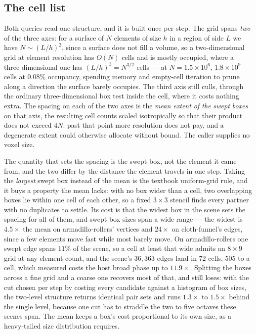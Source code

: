 \subsection{The cell list}
\label{sec:bp:grid}

Both queries read one structure, and it is built once per step. The grid spans
\emph{two} of the three axes: for a surface of $N$ elements of size $h$ in a
region of side $L$ we have $N \sim (L/h)^{2}$, since a surface does not fill a
volume, so a two-dimensional grid at element resolution has $O(N)$ cells and is
mostly occupied, where a three-dimensional one has $(L/h)^{3} = N^{3/2}$ cells
--- at $N = 1.5\times10^{6}$, $1.8\times10^{9}$ cells at $0.08\%$ occupancy,
spending memory and empty-cell iteration to prune along a direction the surface
barely occupies. The third axis still culls, through the ordinary
three-dimensional box test inside the cell, where it costs nothing extra. The
spacing on each of the two axes is the \emph{mean extent of the swept boxes} on
that axis, the resulting cell counts scaled isotropically so that their product
does not exceed $4N$: past that point more resolution does not pay, and a
degenerate extent could otherwise allocate without bound. The caller supplies no
voxel size.

The quantity that sets the spacing is the swept box, not the element it came
from, and the two differ by the distance the element travels in one step. Taking
the \emph{largest} swept box instead of the mean is the textbook uniform-grid
rule, and it buys a property the mean lacks: with no box wider than a cell, two
overlapping boxes lie within one cell of each other, so a fixed $3\times3$
stencil finds every partner with no duplicates to settle. Its cost is that the
widest box in the scene sets the spacing for all of them, and swept box sizes
span a wide range --- the widest is $4.5\times$ the mean on armadillo-rollers'
vertices and $24\times$ on cloth-funnel's edges, since a few elements move fast
while most barely move. On armadillo-rollers one swept edge spans $11\%$ of the
scene, so a cell at least that wide admits an $8\times9$ grid at any element
count, and the scene's $36{,}363$ edges land in $72$ cells, $505$ to a cell,
which measured costs the host broad phase up to $11.9\times$. Splitting the
boxes across a fine grid and a coarse one recovers most of that, and still
loses: with the cut chosen per step by costing every candidate against a
histogram of box sizes, the two-level structure returns identical pair sets and
runs $1.3\times$ to $1.5\times$ behind the single level, because one cut has to
straddle the two to five octaves these scenes span. The mean keeps a box's cost
proportional to its own size, as a heavy-tailed size distribution requires.

